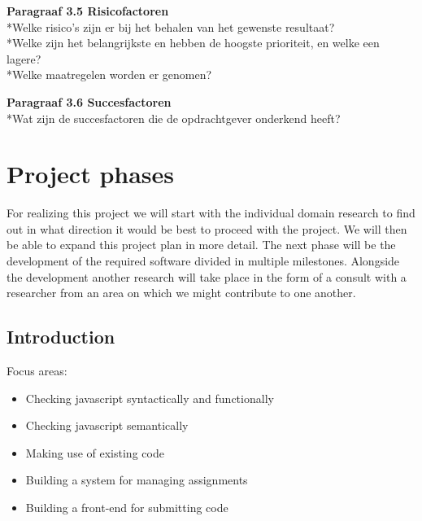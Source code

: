 \documentclass{article}
\begin{document}
\noindent
\textbf{Paragraaf 3.5 Risicofactoren}
\\*Welke risico's zijn er bij het behalen van het gewenste resultaat?
\\*Welke zijn het belangrijkste en hebben de hoogste prioriteit, en welke een lagere?
\\*Welke maatregelen worden er genomen?
\newline

\noindent
\textbf{Paragraaf 3.6 Succesfactoren}
\\*Wat zijn de succesfactoren die de opdrachtgever onderkend heeft?
\newline
\newline

\section{Project phases}


For realizing this project we will start with the individual domain research to find out in what direction it would be best to proceed with the project. We will then be able to expand this project plan in more detail. The next phase will be the development of the required software divided in multiple milestones. Alongside the development another research will take place in the form of a consult with a researcher from an area on which we might contribute to one another.

\subsection{Introduction}


Focus areas:
\begin{itemize}
  \item Checking javascript syntactically and functionally\\
  \item Checking javascript semantically\\
  \item Making use of existing code\\
  \item Building a system for managing assignments\\
  \item Building a front-end for submitting code\\
\end{itemize}
\end{document}
